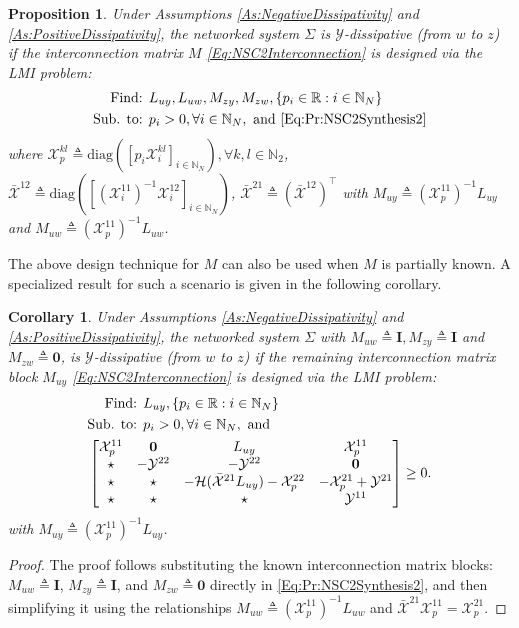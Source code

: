 \documentclass[letterpaper, 10 pt, conference]{ieeeconf}%
\newcommand{\R}{\mathbb{R}}
\newcommand{\N}{\mathbb{N}}
\newcommand{\T}{\top}
\newcommand{\I}{\mathbf{I}}
\newcommand{\0}{\mathbf{0}}
\newcommand{\X}{\mathcal{X}}
\newcommand{\Y}{\mathcal{Y}}
\newcommand{\diag}{\text{diag}}
\newcommand{\bm}[1]{\begin{bmatrix}#1\end{bmatrix}}
\newtheorem{corollary}{\textbf{Corollary}}
\newtheorem{proposition}{\textbf{Proposition}}
\begin{document}
\begin{proposition}\label{Pr:NSC2Synthesis}
\cite{Welikala2025Ax1} Under Assumptions \ref{As:NegativeDissipativity} and \ref{As:PositiveDissipativity}, the networked system $\Sigma$ is $\Y$-dissipative (from $w$ to $z$) if the interconnection matrix $M$ \eqref{Eq:NSC2Interconnection} is designed via the LMI problem:
\begin{equation}\label{Eq:Pr:NSC2Synthesis}
    \begin{aligned}
    \mbox{Find: }& L_{uy}, L_{uw}, M_{zy}, M_{zw}, \{p_i\in\R: i\in\N_N\}\\
    \mbox{Sub. to: }& p_i > 0, \forall i\in\N_N, \mbox{ and } \eqref{Eq:Pr:NSC2Synthesis2}
    \end{aligned}
\end{equation}
where 
$\X_p^{kl} \triangleq \diag([p_i\X_i^{kl}]_{i\in\N_N}), \forall k,l\in\N_2$, 
$\bar{\X}^{12} \triangleq \diag([(\X_i^{11})^{-1}\X_i^{12}]_{i\in\N_N})$, $\bar{\X}^{21} \triangleq (\bar{\X}^{12})^\T$ with 
$M_{uy} \triangleq (\X_p^{11})^{-1} L_{uy}$ and $M_{uw} \triangleq  (\X_p^{11})^{-1} L_{uw}$.
\end{proposition}

The above design technique for $M$ can also be used when $M$ is partially known. A specialized result for such a scenario is given in the following corollary. 

\begin{corollary}\label{Co:NSC2Synthesis}
Under Assumptions \ref{As:NegativeDissipativity} and \ref{As:PositiveDissipativity}, the networked system $\Sigma$ with $M_{uw} \triangleq \I, M_{zy} \triangleq \I$ and $M_{zw} \triangleq \0$, is $\Y$-dissipative (from $w$ to $z$) if the remaining interconnection matrix block $M_{uy}$ \eqref{Eq:NSC2Interconnection} is designed via the LMI problem:
\begin{equation}\label{Eq:Co:NSC2Synthesis}
\begin{aligned}
\mbox{Find: }& L_{uy}, \{p_i \in \R: i\in\N_N\}\\
\mbox{Sub. to: }& p_i > 0, \forall i\in\N_N, \mbox{ and }\\
\span \bm{
\X_p^{11} & \0 & L_{uy} & \X_p^{11} \\
\star & -\Y^{22} & -\Y^{22} & \0 \\ 
\star& \star & -\mathcal{H}(\bar{\X}^{21}L_{uy})-\X_p^{22} & -\X_p^{21}+\Y^{21} \\
\star & \star & \star &  \Y^{11}
} \geq 0.
\end{aligned}
\end{equation}
with $M_{uy} \triangleq (\X_p^{11})^{-1} L_{uy}$.
\end{corollary}
\begin{proof}
The proof follows substituting the known interconnection matrix blocks: $M_{uw} \triangleq \I$, $M_{zy} \triangleq \I$, and $M_{zw} \triangleq \0$ directly in \eqref{Eq:Pr:NSC2Synthesis2}, and then simplifying it using the relationships $M_{uw} \triangleq  (\X_p^{11})^{-1} L_{uw}$ and $\bar{\X}^{21}\X_p^{11} = \X_p^{21}$.
\end{proof}
\end{document}
